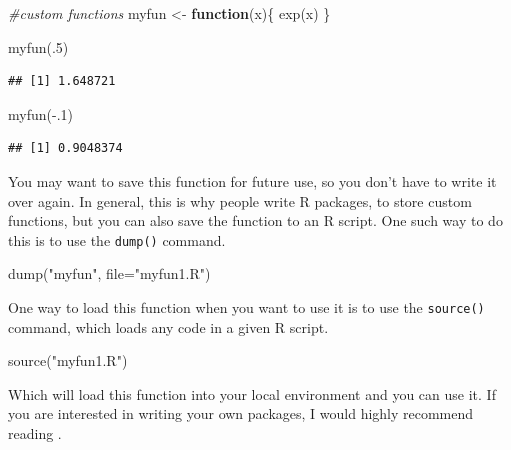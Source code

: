 \documentclass[
]{book}
\newenvironment{Shaded}{\begin{snugshade}}{\end{snugshade}}
\newcommand{\AttributeTok}[1]{\textcolor[rgb]{0.77,0.63,0.00}{#1}}
\newcommand{\CommentTok}[1]{\textcolor[rgb]{0.56,0.35,0.01}{\textit{#1}}}
\newcommand{\ControlFlowTok}[1]{\textcolor[rgb]{0.13,0.29,0.53}{\textbf{#1}}}
\newcommand{\DecValTok}[1]{\textcolor[rgb]{0.00,0.00,0.81}{#1}}
\newcommand{\FunctionTok}[1]{\textcolor[rgb]{0.00,0.00,0.00}{#1}}
\newcommand{\NormalTok}[1]{#1}
\newcommand{\OtherTok}[1]{\textcolor[rgb]{0.56,0.35,0.01}{#1}}
\newcommand{\SpecialCharTok}[1]{\textcolor[rgb]{0.00,0.00,0.00}{#1}}
\newcommand{\StringTok}[1]{\textcolor[rgb]{0.31,0.60,0.02}{#1}}
\begin{document}
\begin{Shaded}
\begin{Highlighting}[]
\CommentTok{\#custom functions}
\NormalTok{myfun }\OtherTok{\textless{}{-}} \ControlFlowTok{function}\NormalTok{(x)\{}
  \FunctionTok{exp}\NormalTok{(x)}
\NormalTok{\}}

\FunctionTok{myfun}\NormalTok{(.}\DecValTok{5}\NormalTok{)}
\end{Highlighting}
\end{Shaded}

\begin{verbatim}
## [1] 1.648721
\end{verbatim}

\begin{Shaded}
\begin{Highlighting}[]
\FunctionTok{myfun}\NormalTok{(}\SpecialCharTok{{-}}\NormalTok{.}\DecValTok{1}\NormalTok{)}
\end{Highlighting}
\end{Shaded}

\begin{verbatim}
## [1] 0.9048374
\end{verbatim}

You may want to save this function for future use, so you don't have to
write it over again. In general, this is why people write R packages, to
store custom functions, but you can also save the function to an R
script. One such way to do this is to use the \texttt{dump()} command.

\begin{Shaded}
\begin{Highlighting}[]
\FunctionTok{dump}\NormalTok{(}\StringTok{"myfun"}\NormalTok{, }
     \AttributeTok{file=}\StringTok{"myfun1.R"}\NormalTok{)}
\end{Highlighting}
\end{Shaded}

One way to load this function when you want to use it is to use the
\texttt{source()} command, which loads any code in a given R script.

\begin{Shaded}
\begin{Highlighting}[]
\FunctionTok{source}\NormalTok{(}\StringTok{"myfun1.R"}\NormalTok{)}
\end{Highlighting}
\end{Shaded}

Which will load this function into your local environment and you can
use it. If you are interested in writing your own packages, I would
highly recommend reading \citet{Wickham}.
\end{document}
